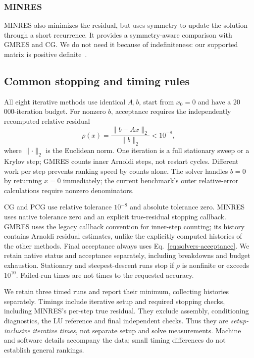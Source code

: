 \subsubsection*{MINRES}
MINRES also minimizes the residual, but uses symmetry to update the
solution through a short recurrence. It provides a symmetry-aware
comparison with GMRES and CG. We do not need it because of indefiniteness:
our supported matrix is positive definite~\cite{saad-iterative}.

\subsection{Common stopping and timing rules}
All eight iterative methods use identical $A,b$, start from $x_0=0$ and
have a 20\,000-iteration budget. For nonzero $b$, acceptance requires the
independently recomputed relative residual
\begin{equation}
 \rho(x)=\frac{\lVert b-Ax\rVert_2}{\lVert b\rVert_2}<10^{-8},
 \label{eq:solvers-acceptance}
\end{equation}
where $\lVert\cdot\rVert_2$ is the Euclidean norm. One iteration is a full
stationary sweep or a Krylov step; GMRES counts inner Arnoldi steps, not
restart cycles. Different work per step prevents ranking speed by counts
alone. The solver handles $b=0$ by returning $x=0$ immediately; the current
benchmark's outer relative-error calculations require nonzero denominators.

CG and PCG use relative tolerance $10^{-8}$ and absolute tolerance zero.
MINRES uses native tolerance zero and an explicit true-residual stopping
callback. GMRES uses the legacy callback convention for inner-step counting;
its history contains Arnoldi residual estimates, unlike the explicitly
computed histories of the other methods. Final acceptance always uses
Eq.~\eqref{eq:solvers-acceptance}. We retain native status and acceptance
separately, including breakdowns and budget exhaustion. Stationary and
steepest-descent runs stop if $\rho$ is nonfinite or exceeds $10^{10}$.
Failed-run times are not times to the requested accuracy.

We retain three timed runs and report their minimum, collecting histories
separately. Timings include iterative setup and required stopping checks,
including MINRES's per-step true residual. They exclude assembly,
conditioning diagnostics, the LU reference and final independent checks.
Thus they are \emph{setup-inclusive iterative times}, not separate setup
and solve measurements. Machine and software details accompany the data;
small timing differences do not establish general rankings.

